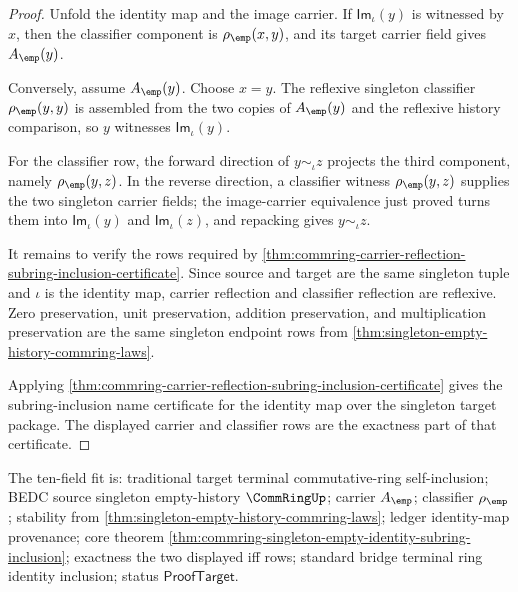 \begin{proof}
Unfold the identity map and the image carrier. If
$\mathsf{Im}_{\iota}(y)$ is witnessed by $x$, then the classifier component is
$\rho_{\emp}(x,y)$, and its target carrier field gives $A_{\emp}(y)$.

Conversely, assume $A_{\emp}(y)$. Choose $x=y$. The reflexive singleton
classifier $\rho_{\emp}(y,y)$ is assembled from the two copies of
$A_{\emp}(y)$ and the reflexive history comparison, so $y$ witnesses
$\mathsf{Im}_{\iota}(y)$.

For the classifier row, the forward direction of $y\sim_{\iota}z$ projects the
third component, namely $\rho_{\emp}(y,z)$. In the reverse direction, a
classifier witness $\rho_{\emp}(y,z)$ supplies the two singleton carrier
fields; the image-carrier equivalence just proved turns them into
$\mathsf{Im}_{\iota}(y)$ and $\mathsf{Im}_{\iota}(z)$, and repacking gives
$y\sim_{\iota}z$.

It remains to verify the rows required by
\autoref{thm:commring-carrier-reflection-subring-inclusion-certificate}. Since
source and target are the same singleton tuple and $\iota$ is the identity map,
carrier reflection and classifier reflection are reflexive. Zero preservation,
unit preservation, addition preservation, and multiplication preservation are
the same singleton endpoint rows from
\autoref{thm:singleton-empty-history-commring-laws}.

Applying
\autoref{thm:commring-carrier-reflection-subring-inclusion-certificate} gives
the subring-inclusion name certificate for the identity map over the singleton
target package. The displayed carrier and classifier rows are the exactness
part of that certificate.
\end{proof}

The ten-field fit is: traditional target terminal commutative-ring
self-inclusion; BEDC source singleton empty-history $\CommRingUp$; carrier
$A_{\emp}$; classifier $\rho_{\emp}$; stability from
\autoref{thm:singleton-empty-history-commring-laws}; ledger identity-map
provenance; core theorem
\autoref{thm:commring-singleton-empty-identity-subring-inclusion}; exactness
the two displayed iff rows; standard bridge terminal ring identity inclusion;
status $\mathsf{ProofTarget}$.
